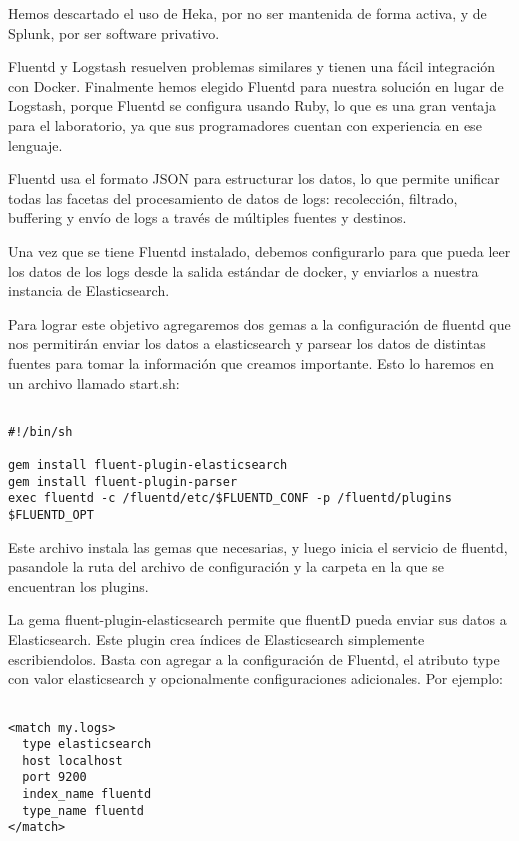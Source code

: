 Hemos descartado el uso de Heka, por no ser mantenida de forma activa, y de
Splunk, por ser software privativo.

Fluentd y Logstash resuelven problemas similares y tienen una fácil integración
con Docker. Finalmente hemos elegido Fluentd para nuestra solución en lugar de
Logstash, porque Fluentd se configura usando Ruby, lo que es una gran ventaja
para el laboratorio, ya que sus programadores cuentan con experiencia en ese
lenguaje.

Fluentd usa el formato JSON para estructurar los datos, lo que permite unificar
todas las facetas del procesamiento de datos de logs: recolección, filtrado,
buffering y envío de logs a través de múltiples fuentes y destinos.

Una vez que se tiene Fluentd instalado, debemos configurarlo para que pueda
leer los datos de los logs desde la salida estándar de docker, y enviarlos a
nuestra instancia de Elasticsearch.

Para lograr este objetivo agregaremos dos gemas a la configuración de fluentd
que nos permitirán enviar los datos a elasticsearch y parsear los datos de
distintas fuentes para tomar la información que creamos importante. Esto lo
haremos en un archivo llamado start.sh:

\begin{lstlisting}

#!/bin/sh

gem install fluent-plugin-elasticsearch
gem install fluent-plugin-parser
exec fluentd -c /fluentd/etc/$FLUENTD_CONF -p /fluentd/plugins $FLUENTD_OPT

\end{lstlisting}

Este archivo instala las gemas que necesarias, y luego inicia el servicio de
fluentd, pasandole la ruta del archivo de configuración y la carpeta en la que
se encuentran los plugins.

La gema fluent-plugin-elasticsearch permite que fluentD pueda enviar sus datos
a Elasticsearch. Este plugin crea índices de Elasticsearch simplemente
escribiendolos. Basta con agregar a la configuración de Fluentd, el atributo
type con valor elasticsearch y opcionalmente configuraciones adicionales. Por
ejemplo: 

\begin{lstlisting}

<match my.logs>
  type elasticsearch
  host localhost
  port 9200
  index_name fluentd
  type_name fluentd
</match>

\end{lstlisting}

